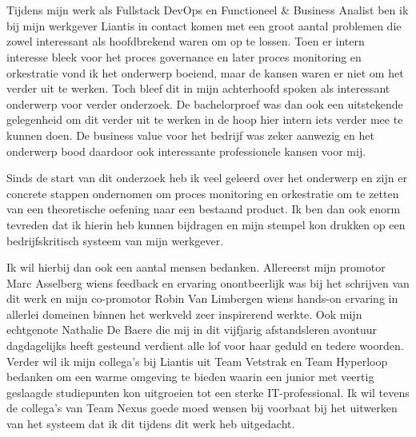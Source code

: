 
\chapter*{}%
\label{ch:voorwoord}

Tijdens mijn werk als Fullstack DevOps en Functioneel & Business Analist ben ik bij mijn werkgever Liantis in contact komen met een groot aantal problemen die zowel interessant als hoofdbrekend waren om op te lossen. Toen er intern interesse bleek voor het proces governance en later proces monitoring en orkestratie vond ik het onderwerp boeiend, maar de kansen waren er niet om het verder uit te werken. Toch bleef dit in mijn achterhoofd spoken als interessant onderwerp voor verder onderzoek. De bachelorproef was dan ook een uitstekende gelegenheid om dit verder uit te werken in de hoop hier intern iets verder mee te kunnen doen. De business value voor het bedrijf was zeker aanwezig en het onderwerp bood daardoor ook interessante professionele kansen voor mij. 

Sinds de start van dit onderzoek heb ik veel geleerd over het onderwerp en zijn er concrete stappen ondernomen om proces monitoring en orkestratie om te zetten van een theoretische oefening naar een bestaand product. Ik ben dan ook enorm tevreden dat ik hierin heb kunnen bijdragen en mijn stempel kon drukken op een bedrijfskritisch systeem van mijn werkgever.

Ik wil hierbij dan ook een aantal mensen bedanken. Allereerst mijn promotor Marc Asselberg wiens feedback en ervaring onontbeerlijk was bij het schrijven van dit werk en mijn co-promotor Robin Van Limbergen wiens hands-on ervaring in allerlei domeinen binnen het werkveld zeer inspirerend werkte. Ook mijn echtgenote Nathalie De Baere die mij in dit vijfjarig afstandsleren avontuur dagdagelijks heeft gesteund verdient alle lof voor haar geduld en tedere woorden. Verder wil ik mijn collega's bij Liantis uit Team Vetstrak en Team Hyperloop bedanken om een warme omgeving te bieden waarin een junior met veertig geslaagde studiepunten kon uitgroeien tot een sterke IT-professional. Ik wil tevens de collega's van Team Nexus goede moed wensen bij voorbaat bij het uitwerken van het systeem dat ik dit tijdens dit werk heb uitgedacht.    

\lipsum[1-2]